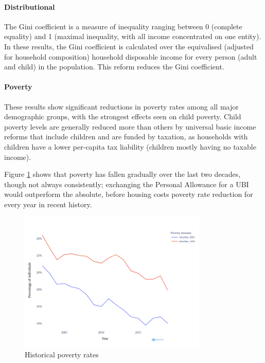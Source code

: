 \documentclass{article}
\begin{document}
    \paragraph{Distributional} The Gini coefficient is a measure of inequality ranging between 0 (complete equality) and 1 (maximal inequality, with all income concentrated on one entity). In these results, the Gini coefficient is calculated over the equivalised (adjusted for household composition) household disposable income for every person (adult and child) in the population. This reform reduces the Gini coefficient.
    
    \paragraph{Poverty} These results show significant reductions in poverty rates among all major demographic groups, with the strongest effects seen on child poverty. Child poverty levels are generally reduced more than others by universal basic income reforms that include children and are funded by taxation, as households with children have a lower per-capita tax liability (children mostly having no taxable income). 
    
    Figure \ref{fig:poverty_rates_hist} shows that poverty has fallen gradually over the last two decades, though not always consistently; exchanging the Personal Allowance for a UBI would outperform the absolute, before housing costs poverty rate reduction for every year in recent history.

    \begin{figure}
        \centering
        \includegraphics[width=0.8\textwidth]{images/fig_5.png}
        \caption{Historical poverty rates}
        \label{fig:poverty_rates_hist}
    \end{figure}
    
\end{document}
